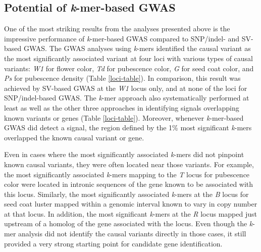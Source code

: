\subsection*{Potential of \emph{k}-mer-based GWAS}
\label{sv-gwas-potential-kmers}

One of the most striking results from the analyses presented above is the
impressive performance of \emph{k}-mer-based GWAS compared to SNP/indel- and
SV-based GWAS. The GWAS analyses using \emph{k}-mers identified
the causal variant as the most significantly associated variant at four loci
with various types of causal variants: \emph{W1} for flower color, \emph{Td}
for pubescence color, \emph{G} for seed coat color, and \emph{Ps} for
pubescence density (Table \ref{loci-table}). In comparison, this result was achieved by SV-based GWAS
at the \textit{W1} locus only, and at none of the loci for SNP/indel-based GWAS.
The \textit{k}-mer approach also systematically performed at least as well as
the other three approaches in identifying signals overlapping known variants or genes
(Table \ref{loci-table}). Moreover, whenever \textit{k}-mer-based GWAS did
detect a signal, the region defined by the 1\% most significant \textit{k}-mers
overlapped the known causal variant or gene. 

Even in cases where the most significantly associated \emph{k}-mers did not
pinpoint known causal variants, they were often located near
those variants. For example, the most significantly associated \emph{k}-mers
mapping to the \emph{T} locus for pubescence color were located in intronic sequences
of the gene known to be associated with this locus.
Similarly, the most significantly associated
\emph{k}-mers at the \emph{B} locus for seed coat luster mapped within a
genomic interval known to vary in copy number at that locus. In addition, the most
significant \emph{k}-mers at the \emph{R} locus mapped just upstream of a
homolog of the gene associated with the locus. Even though the \emph{k}-mer
analysis did not identify the causal variants directly in those cases, it still
provided a very strong starting point for candidate gene identification.

